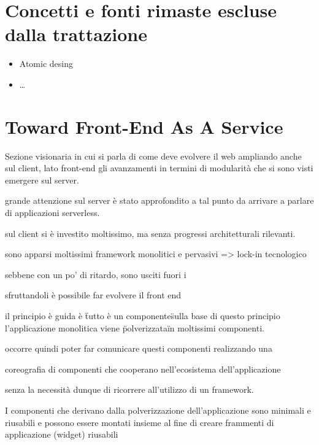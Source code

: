 \documentclass{sig-alternate-05-2015}
\begin{document}
\subsection{}






\section{Concetti e fonti rimaste escluse dalla trattazione}
\begin{itemize}
  \item Atomic desing
  \item \dots
\end{itemize}


\section{Toward Front-End As A Service}

Sezione visionaria in cui si parla di come deve evolvere il web ampliando anche sul client, lato front-end gli avanzamenti in termini di modularità che si sono visti emergere sul server.


grande attenzione sul server è stato approfondito a tal punto da arrivare a parlare di applicazioni serverless.

sul client si è investito moltissimo, ma senza progressi architetturali rilevanti.

sono apparsi moltissimi framework monolitici e pervasivi => lock-in tecnologico

sebbene con un po' di ritardo, sono usciti fuori i \WC

sfruttandoli è possibile far evolvere il front end

il principio è guida è \"tutto è un componente\"

sulla base di questo principio l'applicazione monolitica viene \"polverizzata\" in moltissimi componenti.

occorre quindi poter far comunicare questi componenti realizzando una

coreografia di componenti che cooperano nell'ecosistema dell'applicazione

senza la necessità dunque di ricorrere all'utilizzo di un framework.

I componenti che derivano dalla polverizzazione dell'applicazione sono minimali e riusabili e possono essere montati insieme al fine di creare frammenti di applicazione (widget) riusabili
\end{document}
